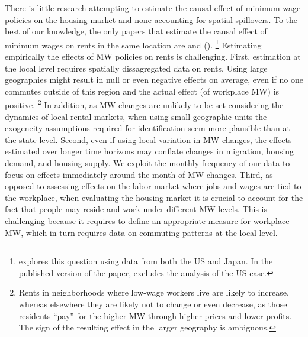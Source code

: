
There is little research attempting to estimate the causal effect of minimum wage 
policies on the housing market and none accounting for spatial spillovers.
To the best of our knowledge, the only papers that estimate the causal effect of 
minimum wages on rents in the same location are \textcite{Tidemann2018} and 
\citeauthor{Yamagishi2019} (\citeyear{Yamagishi2019, Yamagishi2021}).%
\footnote{\textcite{Yamagishi2019} explores this question using data from both the
US and Japan. In the published version of the paper, \textcite{Yamagishi2021} 
excludes the analysis of the US case.}
Estimating empirically the effects of MW policies on rents is challenging. 
First, estimation at the local level requires spatially dissagregated data on rents.
Using large geographies might result in null or even negative effects on average,
even if no one commutes outside of this region and the actual effect (of workplace
MW) is positive.%
\footnote{Rents in neighborhoods where low-wage workers live are likely to 
increase, whereas elsewhere they are likely not to change or even decrease, as 
those residents ``pay'' for the higher MW through higher prices and lower profits.
The sign of the resulting effect in the larger geography is ambiguous.}
In addition, as MW changes are unlikely to be set considering the dynamics of 
local rental markets, when using small geographic units the exogeneity assumptions 
required for identification seem more plausible than at the state level.
Second, even if using local variation in MW changes, the effects estimated over 
longer time horizons may conflate changes in migration, housing demand, and 
housing supply.
We exploit the monthly frequency of our data to focus on effects immediately
around the month of MW changes.
Third, as opposed to assessing effects on the labor market where jobs and wages 
are tied to the workplace, when evaluating the housing market it is crucial to 
account for the fact that people may reside and work under different MW levels. 
This is challenging because it requires to define an appropriate measure for 
workplace MW, which in turn requires data on commuting patterns at the local level.



